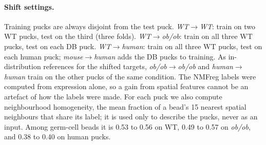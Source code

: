 \paragraph{Shift settings.} Training pucks are always disjoint from the test puck. \emph{WT$\to$WT}: train on two WT pucks, test on the third (three folds). \emph{WT$\to$ob/ob}: train on all three WT pucks, test on each DB puck. \emph{WT$\to$human}: train on all three WT pucks, test on each human puck; \emph{mouse$\to$human} adds the DB pucks to training. As in-distribution references for the shifted targets, \emph{ob/ob$\to$ob/ob} and \emph{human$\to$human} train on the other pucks of the same condition. The NMFreg labels were computed from expression alone, so a gain from spatial features cannot be an artefact of how the labels were made. For each puck we also compute neighbourhood homogeneity, the mean fraction of a bead's 15 nearest spatial neighbours that share its label; it is used only to describe the pucks, never as an input. Among germ-cell beads it is 0.53 to 0.56 on WT, 0.49 to 0.57 on \emph{ob/ob}, and 0.38 to 0.40 on human pucks.
